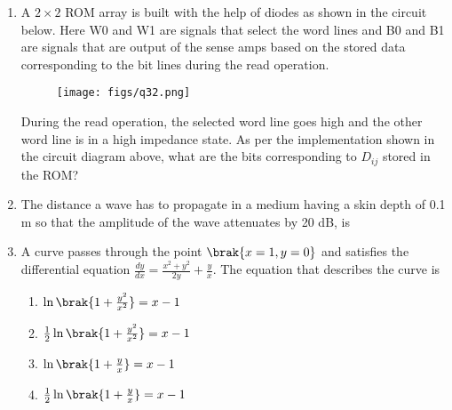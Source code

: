 \documentclass[a4paper, 11pt]{article}
\begin{document}
\begin{enumerate}
    \item A $2 \times 2$ ROM array is built with the help of diodes as shown in the circuit below. Here W0 and W1 are signals that select the word lines and B0 and B1 are signals that are output of the sense amps based on the stored data corresponding to the bit lines during the read operation.
    \begin{figure}[H]
        \centering
        \texttt{[image: figs/q32.png]}
        \caption*{}
        \label{fig:q32}
    \end{figure}
    During the read operation, the selected word line goes high and the other word line is in a high impedance state. As per the implementation shown in the circuit diagram above, what are the bits corresponding to $D_{ij}$  stored in the ROM?
    \begin{enumerate}
    \end{enumerate}

    \hfill{}

    \item The distance  a wave has to propagate in a medium having a skin depth of 0.1 m so that the amplitude of the wave attenuates by 20 dB, is
    \begin{enumerate}
    \end{enumerate}

    \hfill{}

    \item A curve passes through the point $\brak{x=1, y=0}$ and satisfies the differential equation $\frac{dy}{dx} = \frac{x^2+y^2}{2y} + \frac{y}{x}$. The equation that describes the curve is
    \begin{enumerate}
        \item $\ln\brak{1+\frac{y^2}{x^2}} = x-1$
        \item $\frac{1}{2}\ln\brak{1+\frac{y^2}{x^2}} = x-1$
        \item $\ln\brak{1+\frac{y}{x}} = x-1$
        \item $\frac{1}{2}\ln\brak{1+\frac{y}{x}} = x-1$
    \end{enumerate}


\end{enumerate}
\end{document}
